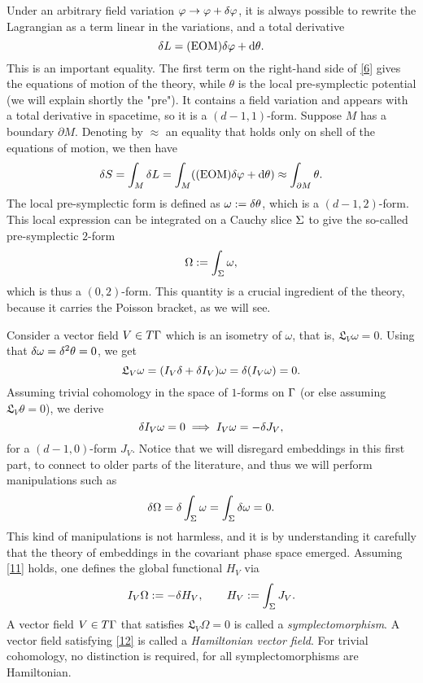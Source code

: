Under an arbitrary field variation $\varphi\to\varphi+\d\varphi$, it is always possible to rewrite the Lagrangian as a term linear in the variations, and a total derivative
\begin{equation}\label{6}
	\d L=(\text{EOM})\d\varphi+\dd\theta.
\end{equation}
This is an important equality. The first term on the right-hand side of \eqref{6} gives the equations of motion of the theory, while $\theta$ is the local pre-symplectic potential (we will explain shortly the "pre"). It contains a field variation and appears with a total derivative in spacetime, so it is a $(d − 1, 1)$-form. Suppose $M$ has a boundary $\partial M$. Denoting by $\approx$ an equality that holds only on shell of the equations of motion, we then have
\begin{equation}\label{7}
	\d S=\int_M\d L=\int_M((\text{EOM})\d\varphi+\dd\theta)\approx\int_{\partial M}\theta.
\end{equation}
The local pre-symplectic form is defined as $\omega:=\d \theta$, which is a $(d-1,2)$-form. This local expression can be integrated on a Cauchy slice $\S $ to give the so-called pre-symplectic $2$-form
\begin{equation}\label{8}
	\Omega:=\int_\S\omega,
\end{equation}
 which is thus a $(0,2)$-form. This quantity is a crucial ingredient of the theory, because it carries the Poisson bracket, as we will see.
 
 Consider a vector field $V\in T\G$ which is an isometry of $\omega$, that is, $\mathfrak{L}_V\omega=0$. Using that $\d\omega=\d^2\theta=0$, we get
 \begin{equation}\label{9}
 	\mathfrak{L}_V\omega=(I_V\d+\d I_V)	\omega=\d(I_V\omega)=0.
 \end{equation}
 Assuming trivial cohomology in the space of $1$-forms on $\G $ (or else assuming $\mathfrak{L}_V\theta=0$), we derive
 \begin{equation}\label{10}
 	\d I_V\omega=0\implies I_V\omega=-\d J_V,
 \end{equation}
 for a $(d-1,0)$-form $J_V$. Notice that we will disregard embeddings in this first part, to connect to older parts of the literature, and thus we will perform manipulations such as
 \begin{equation}\label{11}
 	\d\Omega=\d\int_\S\omega=\int_\S\d\omega=0.
 \end{equation}
This kind of manipulations is not harmless, and it is by understanding it carefully that the theory of embeddings in the covariant phase space emerged.
 Assuming \eqref{11} holds, one defines the global functional $H_V$ via
 \begin{equation}\label{12}
 	I_V\Omega:=-\d H_V,\qquad H_V:=\int_\S J_V.
 \end{equation}
 A vector field $V\in T\G $ that satisfies $\mathfrak{L}_V\Omega=0$ is called a \textit{symplectomorphism}. A vector field satisfying \eqref{12} is called a \textit{Hamiltonian vector field}. For trivial cohomology, no distinction is required, for all symplectomorphisms are Hamiltonian.
 

